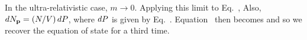 {	In the ultra-relativistic case, $m \to 0$.  Applying this limit to Eq.~,
	Also, $\dd{N_{\vb{p}}} = (N / V) \dd{P}$, where $\dd{P}$ is given by Eq.~.  Equation~ then becomes
	and so we recover the equation of state for a third time.
}